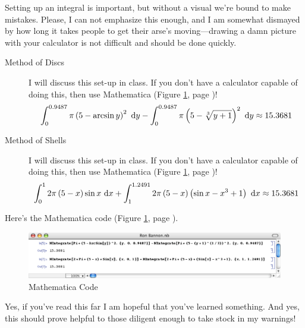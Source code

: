 \documentclass[12pt,addpoints, answers, fleqn]{exam}
\begin{document}
Setting up an integral is important, but without a visual we're bound to make mistakes. Please, I can not emphasize this enough, and I am somewhat dismayed by how long it takes people to get their arse's moving---drawing a damn picture with your calculator is not difficult and should be done quickly.
\begin{description}
\item[Method of Discs] I will discuss this set-up in class. If you don't have a calculator capable of doing this, then use Mathematica (Figure \ref{fig:window32}, page \pageref{fig:window32})!
\[
\int_0^{0.9487} \pi \left( 5 - \arcsin y \right)^2 \ {\rm{d}}y
-\int_0^{0.9487} \pi \left( 5 - \sqrt[3]{y+1} \right)^2 \ {\rm{d}}y \approx 15.3681
\]
\item[Method of Shells] I will discuss this set-up in class. If you don't have a calculator capable of doing this, then use Mathematica (Figure \ref{fig:window32}, page \pageref{fig:window32})!
\[
\int_0^{1} 2\pi \left( 5 - x \right) \sin x \ {\rm{d}}x
+\int_1^{1.2491} 2\pi \left( 5 - x \right) \left( \sin x -x^3 + 1\right)\ {\rm{d}}x \approx 15.3681
\]
\end{description}
Here's the Mathematica code (Figure \ref{fig:window32}, page \pageref{fig:window32}).
\begin{figure}[htbp] %
   \centering
   \includegraphics[width=6in]{./graphics/window32.pdf} 
   \caption{Mathematica Code}
   \label{fig:window32}
\end{figure}
Yes, if you've read this far I am hopeful that you've learned something. And yes, this should prove helpful to those diligent enough to take stock in my warnings!
\end{document}
